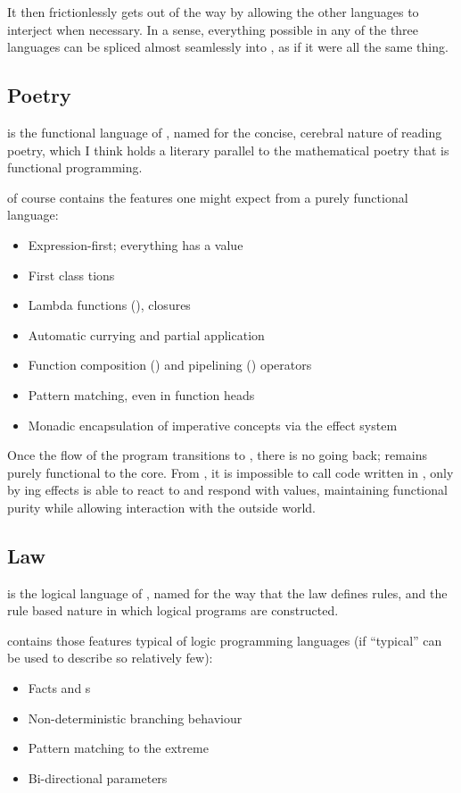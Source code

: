 It then frictionlessly gets out of the way by allowing the other languages
to interject when necessary. In a sense, everything possible in any of the
three languages can be spliced almost seamlessly into \Prose{}, as if it
were all the same thing.

\subsection{Poetry}

\Poetry{} is the functional language of \Trilogy{}, named for
the concise, cerebral nature of reading poetry, which I think
holds a literary parallel to the mathematical poetry that is
functional programming.

\Poetry{} of course contains the features one might expect from a purely
functional language:
\begin{itemize}
    \item Expression-first; everything has a value
    \item First class tions
    \item Lambda functions (), closures
    \item Automatic currying and partial application
    \item Function composition (\op{>>}) and pipelining (\op{|>}) operators
    \item Pattern matching, even in function heads
    \item Monadic encapsulation of imperative concepts via the effect system
\end{itemize}

Once the flow of the program transitions to \Poetry{}, there is no going
back; \Poetry{} remains purely functional to the core. From \Poetry{}, it
is impossible to call code written in \Prose{}, only by ing effects
is \Prose{} able to react to \Poetry{} and respond with values, maintaining
functional purity while allowing interaction with the outside world.

\subsection{Law}

\Law{} is the logical language of \Trilogy{}, named for the way that
the law defines rules, and the rule based nature in which logical
programs are constructed.

\Law{} contains those features typical of logic programming languages
(if ``typical'' can be used to describe so relatively few):
\begin{itemize}
    \item Facts and s
    \item Non-deterministic branching behaviour
    \item Pattern matching to the extreme
    \item Bi-directional parameters
\end{itemize}

